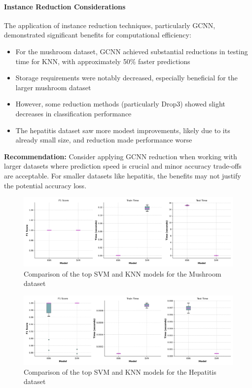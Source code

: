 \paragraph{Instance Reduction Considerations}
The application of instance reduction techniques, particularly GCNN, demonstrated significant benefits for computational efficiency:

\begin{itemize}
    \item For the mushroom dataset, GCNN achieved substantial reductions in testing time for KNN, with approximately 50\% faster predictions
    \item Storage requirements were notably decreased, especially beneficial for the larger mushroom dataset
    \item However, some reduction methods (particularly Drop3) showed slight decreases in classification performance
    \item The hepatitis dataset saw more modest improvements, likely due to its already small size, and reduction made performance worse
\end{itemize}

\textbf{Recommendation:} Consider applying GCNN reduction when working with larger datasets where prediction speed is crucial and minor accuracy trade-offs are acceptable. For smaller datasets like hepatitis, the benefits may not justify the potential accuracy loss.




\begin{figure}
    \centering
    \includegraphics[width=\textwidth]{figures/model_comparison_mushroom.png}
    \caption{Comparison of the top SVM and KNN models for the Mushroom dataset}
    \label{fig:model-comparison-mushroom}
\end{figure}

\begin{figure}
    \centering
    \includegraphics[width=\textwidth]{figures/model_comparison_hepatitis.png}
    \caption{Comparison of the top SVM and KNN models for the Hepatitis dataset}
    \label{fig:model-comparison-hepatitis}
\end{figure}


